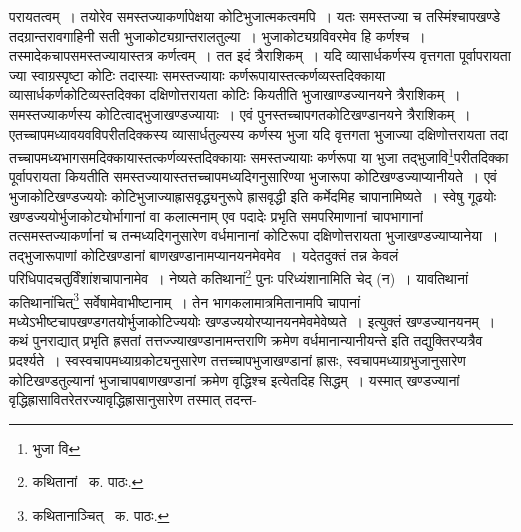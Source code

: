 \documentclass[11pt, openany]{book}
\begin{document}
\noindent परायतत्वम्~। तयोरेव समस्तज्याकर्णापेक्षया कोटिभुजात्मकत्वमपि~। यतः समस्तज्या च तस्मिंश्चापखण्डे तदग्रान्तरावगाहिनी सती भुजाकोट्यग्रान्तरालतुल्या~। भुजाकोट्यग्रविवरमेव हि कर्णश्च~। तस्मादेकचापसमस्तज्यायास्तत्र कर्णत्वम्~। तत इदं त्रैराशिकम्~। यदि व्यासार्धकर्णस्य वृत्तगता पूर्वापरायता ज्या स्वाग्रस्पृष्टा कोटिः तदास्याः समस्तज्यायाः कर्णरूपायास्तत्कर्णव्यस्तदिक्काया व्यासार्धकर्णकोटिव्यस्तदिक्का दक्षिणोत्तरायता कोटिः कियतीति भुजाखाण्डज्यानयने त्रैराशिकम्~। समस्तज्याकर्णस्य कोटित्वाद्भुजाखण्डज्यायाः~। एवं पुनस्तच्चापगतकोटिखण्डानयने त्रैराशिकम्~। एतच्चापमध्यावयवविपरीतदिक्कस्य व्यासार्धतुल्यस्य कर्णस्य भुजा यदि वृत्तगता भुजाज्या दक्षिणोत्तरायता तदा तच्चापमध्यभागसमदिक्कायास्तत्कर्णव्यस्तदिक्कायाः समस्तज्यायाः कर्णरूपा या भुजा तद्भुजावि\renewcommand{\thefootnote}{१}\footnote{भुजा वि}परीतदिक्का पूर्वापरायता कियतीति समस्तज्यायास्तत्तच्चापमध्यदिगनुसारिण्या भुजारूपा कोटिखण्डज्याप्यानीयते~। एवं भुजाकोटिखण्डज्ययोः कोटिभुजाज्याह्रासवृद्ध्यनुरूपे ह्रासवृद्धी इति कर्मेदमिह चापानामिष्यते~। स्वेषु गूढयोः खण्डज्ययोर्भुजाकोट्योर्भागानां वा कलात्मनाम् एव पदादेः प्रभृति समपरिमाणानां चापभागानां तत्समस्तज्याकर्णानां च तन्मध्यदिगनुसारेण वर्धमानानां कोटिरूपा दक्षिणोत्तरायता भुजाखण्डज्याप्यानेया~। तद्भुजारूपाणां कोटिखण्डानां बाणखण्डानामप्यानयनमेवमेव~। यदेतदुक्तं तन्न केवलं परिधिपादचतुर्विंशांशचापानामेव~। नेष्यते कतिथानां\renewcommand{\thefootnote}{२}\footnote{कथितानां \textendash\ क. पाठः.} पुनः परिध्यंशानामिति चेद् (न)~। यावतिथानां कतिथानांचित्\renewcommand{\thefootnote}{३}\footnote{कथितानाञ्चित् \textendash\ क. पाठः.} सर्वेषामेवाभीष्टानाम्~। तेन भागकलामात्रमितानामपि चापानां मध्येऽभीष्टचापखण्डगतयोर्भुजाकोटिज्ययोः खण्डज्ययोरप्यानयनमेवमेवेष्यते~। इत्युक्तं खण्डज्यानयनम्~।\\

कथं पुनराद्यात् प्रभृति ह्रसतां तत्तज्ज्याखण्डानामन्तराणि क्रमेण वर्धमानान्यानीयन्ते इति तद्युक्तिरप्यत्रैव प्रदर्श्यते~। स्वस्वचापमध्याग्रकोट्यनुसारेण तत्तच्चापभुजाखण्डानां ह्रासः, स्वचापमध्याग्रभुजानुसारेण कोटिखण्डतुल्यानां भुजाचापबाणखण्डानां क्रमेण वृद्धिश्च इत्येतदिह सिद्धम्~। यस्मात् खण्डज्यानां वृद्धिह्रासावितरेतरज्यावृद्धिह्रासानुसारेण तस्मात् तदन्त-

\newpage
\end{document}
